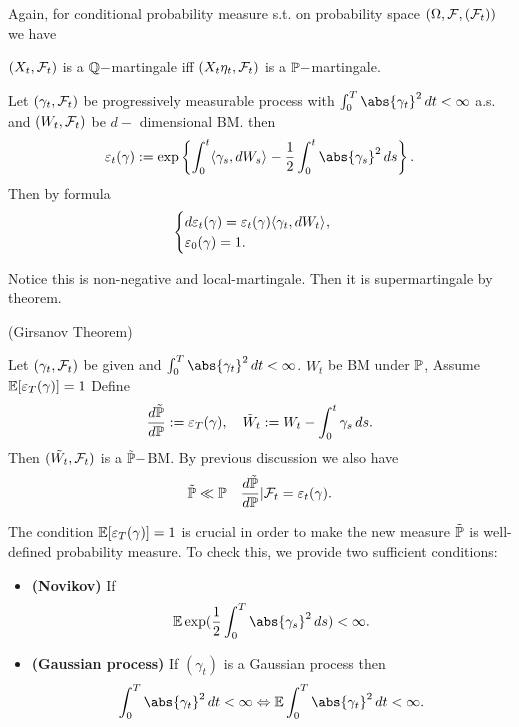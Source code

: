 Again, for conditional probability measure s.t. on probability space $(\Omega, \mathcal{F}, (\mathcal{F}_t))$ we have

$(X_t, \mathcal{F}_t)$ is a $\mathbb{Q}-$martingale iff $(X_t\eta_t, \mathcal{F}_t)$ is a $\mathbb{P}-$martingale.

\begin{dfn}

Let $(\gamma_t, \mathcal{F}_t)$ be progressively measurable process with $\int_0^T \abs{\gamma_t}^2 \diff t < \infty$ a.s. and $(W_t ,\mathcal{F}_t)$ be $d-$ dimensional BM. then
\begin{equation*}
    \varepsilon_t(\gamma) := \exp\left\{\int_0^t \qvar{\gamma_s,\diff W_s}{} - \frac{1}{2}\int_0^t \abs{\gamma_s}^2 \diff s \right\}.
\end{equation*}
Then by \ito formula \begin{equation*}
    \begin{cases}
    \mathop{}\!d \varepsilon_t(\gamma) = \varepsilon_t(\gamma) \langle{\gamma_t,\mathop{}\!dW_t} \rangle_{}, \\
    \varepsilon_0(\gamma) = 1.
    \end{cases}
\end{equation*}
\end{dfn}
Notice this is non-negative and local-martingale. Then it is supermartingale by theorem.

\begin{thm}{(Girsanov Theorem)}

Let $(\gamma_t, \mathcal{F}_t)$ be given and $\int_0^T \abs{\gamma_t}^2 \diff t < \infty$. $W_t$ be BM under $\mathbb{P}$, Assume $\mathbb{E}[\varepsilon_T(\gamma)] = 1$ Define 
\begin{equation*}
    \frac{\mathop{}\!d \tilde{\mathbb{P}}}{\mathop{}\!d \mathbb{P}} := \varepsilon_T(\gamma), \quad \tilde{W}_t := W_t - \int_0^t \gamma_s \mathop{}\!d s.
\end{equation*}
Then $(\tilde{W_t}, \mathcal{F}_t)$ is a $\tilde{\mathbb{P}}-$BM. By previous discussion we also have 
\begin{equation*}
    \tilde{\mathbb{P}} \ll \mathbb{P} \quad \frac{\mathop{}\!d \tilde{\mathbb{P}}}{\mathop{}\!d \mathbb{P}}|\mathcal{F}_t = \varepsilon_t(\gamma).
\end{equation*}
\end{thm}

\begin{rem}
The condition $\mathbb{E}[\varepsilon_T(\gamma)] = 1$ is crucial in order to make the new measure $\tilde{\mathbb{P}}$ is well-defined probability measure. To check this, we provide two sufficient conditions:
\begin{itemize}
    \item \textbf{(Novikov)} If 
    \begin{equation*}
        \E\exp(\frac{1}{2}\int_0^T \abs{\gamma_s}^2 \diff s) < \infty.
    \end{equation*}
    \item \textbf{(Gaussian process)} If $(\gamma_t)$ is a Gaussian process then 
    \begin{equation*}
        \int_0^T \abs{\gamma_t}^2 \diff t < \infty 	\Leftrightarrow \E \int_0^T \abs{\gamma_t}^2 \diff t < \infty.
    \end{equation*}
\end{itemize}
\end{rem}

